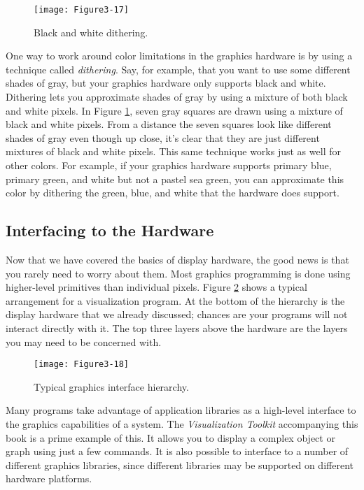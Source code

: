 \begin{figure}[!htb]
  \centering
  \texttt{[image: Figure3-17]}\\
  \caption{Black and white dithering.}\label{fig:Figure3-17}
\end{figure}

One way to work around color limitations in the graphics hardware is by using a technique called \emph{dithering}. Say, for example, that you want to use some different shades of gray, but your graphics hardware only supports black and white. Dithering lets you approximate shades of gray by using a mixture of both black and white pixels. In Figure \ref{fig:Figure3-17}, seven gray squares are drawn using a mixture of black and white pixels. From a distance the seven squares look like different shades of gray even though up close, it's clear that they are just different mixtures of black and white pixels. This same technique works just as well for other colors. For example, if your graphics hardware supports primary blue, primary green, and white but not a pastel sea green, you can approximate this color by dithering the green, blue, and white that the hardware does support.

\subsection{Interfacing to the Hardware}
Now that we have covered the basics of display hardware, the good news is that you rarely need to worry about them. Most graphics programming is done using higher-level primitives than individual pixels. Figure \ref{fig:Figure3-18} shows a typical arrangement for a visualization program. At the bottom of the hierarchy is the display hardware that we already discussed; chances are your programs will not interact directly with it. The top three layers above the hardware are the layers you may need to be concerned with.

\begin{figure}[!htb]
  \centering
  \texttt{[image: Figure3-18]}\\
  \caption{Typical graphics interface hierarchy.}\label{fig:Figure3-18}
\end{figure}

Many programs take advantage of application libraries as a high-level interface to the graphics capabilities of a system. The \emph{Visualization Toolkit} accompanying this book is a prime example of this. It allows you to display a complex object or graph using just a few commands. It is also possible to interface to a number of different graphics libraries, since different libraries may be supported on different hardware platforms.

